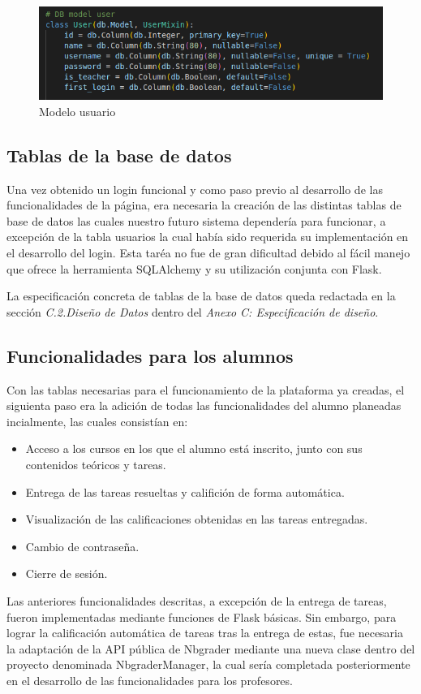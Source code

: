 \begin{figure}[h]
    \centering
    \includegraphics[scale=0.9]{img/imgs-memoria/UserModel.PNG}
    \caption{Modelo usuario}
\end{figure}

\subsection{Tablas de la base de datos}
Una vez obtenido un login funcional y como paso previo al desarrollo de las funcionalidades de la página, era necesaria la creación de las distintas tablas de base de datos las cuales nuestro futuro sistema dependería para funcionar, a excepción de la tabla usuarios la cual había sido requerida su implementación en el desarrollo del login. Esta taréa no fue de gran dificultad debido al fácil manejo que ofrece la herramienta SQLAlchemy y su utilización conjunta con Flask. 

La especificación concreta de tablas de la base de datos queda redactada en la sección \textit{C.2.Diseño de Datos} dentro del \textit{Anexo C: Especificación de diseño}.

\subsection{Funcionalidades para los alumnos}
Con las tablas necesarias para el funcionamiento de la plataforma ya creadas, el siguienta paso era la adición de todas las funcionalidades del alumno planeadas incialmente, las cuales consistían en: 
\begin{itemize}
\item Acceso a los cursos en los que el alumno está inscrito, junto con sus contenidos teóricos y tareas.
\item Entrega de las tareas resueltas y califición de forma automática.
\item Visualización de las calificaciones obtenidas en las tareas entregadas.
\item Cambio de contraseña.
\item Cierre de sesión.
\end{itemize}
Las anteriores funcionalidades descritas, a excepción de la entrega de tareas, fueron implementadas mediante funciones de Flask básicas. Sin embargo, para lograr la calificación automática de tareas tras la entrega de estas, fue necesaria la adaptación de la API pública de Nbgrader\cite{tool:NbgraderAPI} mediante una nueva clase dentro del proyecto denominada NbgraderManager, la cual sería completada posteriormente en el desarrollo de las funcionalidades para los profesores.

